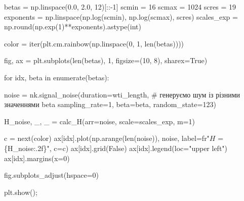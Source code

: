 \documentclass[
  letterpaper,
]{report}
\newenvironment{Shaded}{\begin{snugshade}}{\end{snugshade}}
\newcommand{\BuiltInTok}[1]{\textcolor[rgb]{0.00,0.23,0.31}{#1}}
\newcommand{\CommentTok}[1]{\textcolor[rgb]{0.37,0.37,0.37}{#1}}
\newcommand{\ControlFlowTok}[1]{\textcolor[rgb]{0.00,0.23,0.31}{#1}}
\newcommand{\DecValTok}[1]{\textcolor[rgb]{0.68,0.00,0.00}{#1}}
\newcommand{\FloatTok}[1]{\textcolor[rgb]{0.68,0.00,0.00}{#1}}
\newcommand{\KeywordTok}[1]{\textcolor[rgb]{0.00,0.23,0.31}{#1}}
\newcommand{\NormalTok}[1]{\textcolor[rgb]{0.00,0.23,0.31}{#1}}
\newcommand{\OperatorTok}[1]{\textcolor[rgb]{0.37,0.37,0.37}{#1}}
\newcommand{\SpecialCharTok}[1]{\textcolor[rgb]{0.37,0.37,0.37}{#1}}
\newcommand{\StringTok}[1]{\textcolor[rgb]{0.13,0.47,0.30}{#1}}
\newcommand{\VariableTok}[1]{\textcolor[rgb]{0.07,0.07,0.07}{#1}}
\newcommand{\VerbatimStringTok}[1]{\textcolor[rgb]{0.13,0.47,0.30}{#1}}
\begin{document}
\begin{Shaded}
\begin{Highlighting}[]
\NormalTok{betas }\OperatorTok{=}\NormalTok{ np.linspace(}\FloatTok{0.0}\NormalTok{, }\FloatTok{2.0}\NormalTok{, }\DecValTok{12}\NormalTok{)[::}\OperatorTok{{-}}\DecValTok{1}\NormalTok{]}
\NormalTok{scmin }\OperatorTok{=} \DecValTok{16}
\NormalTok{scmax }\OperatorTok{=} \DecValTok{1024}
\NormalTok{scres }\OperatorTok{=} \DecValTok{19}
\NormalTok{exponents }\OperatorTok{=}\NormalTok{ np.linspace(np.log(scmin), np.log(scmax), scres)}
\NormalTok{scales\_exp }\OperatorTok{=}\NormalTok{ np.}\BuiltInTok{round}\NormalTok{(np.exp(}\DecValTok{1}\NormalTok{)}\OperatorTok{**}\NormalTok{exponents).astype(}\BuiltInTok{int}\NormalTok{)}
\end{Highlighting}
\end{Shaded}

\begin{Shaded}
\begin{Highlighting}[]
\NormalTok{color }\OperatorTok{=} \BuiltInTok{iter}\NormalTok{(plt.cm.rainbow(np.linspace(}\DecValTok{0}\NormalTok{, }\DecValTok{1}\NormalTok{, }\BuiltInTok{len}\NormalTok{(betas))))}

\NormalTok{fig, ax }\OperatorTok{=}\NormalTok{ plt.subplots(}\BuiltInTok{len}\NormalTok{(betas), }\DecValTok{1}\NormalTok{, figsize}\OperatorTok{=}\NormalTok{(}\DecValTok{10}\NormalTok{, }\DecValTok{8}\NormalTok{), sharex}\OperatorTok{=}\VariableTok{True}\NormalTok{)}

\ControlFlowTok{for}\NormalTok{ idx, beta }\KeywordTok{in} \BuiltInTok{enumerate}\NormalTok{(betas):}

\NormalTok{    noise }\OperatorTok{=}\NormalTok{ nk.signal\_noise(duration}\OperatorTok{=}\NormalTok{wti\_length,  }\CommentTok{\# генеруємо шум із різними значеннями beta }
\NormalTok{                              sampling\_rate}\OperatorTok{=}\DecValTok{1}\NormalTok{, }
\NormalTok{                              beta}\OperatorTok{=}\NormalTok{beta, }
\NormalTok{                              random\_state}\OperatorTok{=}\DecValTok{123}\NormalTok{)   }

\NormalTok{    H\_noise, \_, \_ }\OperatorTok{=}\NormalTok{ calc\_H(arr}\OperatorTok{=}\NormalTok{noise, scale}\OperatorTok{=}\NormalTok{scales\_exp, m}\OperatorTok{=}\DecValTok{1}\NormalTok{)}

\NormalTok{    c }\OperatorTok{=} \BuiltInTok{next}\NormalTok{(color)}
\NormalTok{    ax[idx].plot(np.arange(}\BuiltInTok{len}\NormalTok{(noise)), noise, label}\OperatorTok{=}\VerbatimStringTok{fr"$H$ = }\SpecialCharTok{\{}\NormalTok{H\_noise}\SpecialCharTok{:.2f\}}\VerbatimStringTok{"}\NormalTok{, c}\OperatorTok{=}\NormalTok{c)}
\NormalTok{    ax[idx].grid(}\VariableTok{False}\NormalTok{)}
\NormalTok{    ax[idx].legend(loc}\OperatorTok{=}\StringTok{"upper left"}\NormalTok{)}
\NormalTok{    ax[idx].margins(x}\OperatorTok{=}\DecValTok{0}\NormalTok{)}

\NormalTok{fig.subplots\_adjust(hspace}\OperatorTok{=}\DecValTok{0}\NormalTok{)}

\NormalTok{plt.show()}\OperatorTok{;}
\end{Highlighting}
\end{Shaded}
\end{document}
